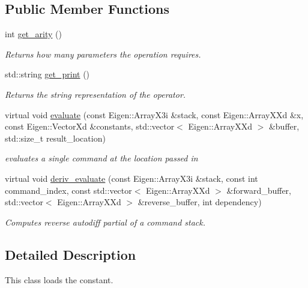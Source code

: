 \subsection*{Public Member Functions}
\begin{DoxyCompactItemize}
\item 
int \hyperlink{classC__Load_ae655fdc171a24965bb5cbb1e2fda9293}{get\+\_\+arity} ()\hypertarget{classC__Load_ae655fdc171a24965bb5cbb1e2fda9293}{}\label{classC__Load_ae655fdc171a24965bb5cbb1e2fda9293}

\begin{DoxyCompactList}\small\item\em Returns how many parameters the operation requires. \end{DoxyCompactList}\item 
std\+::string \hyperlink{classC__Load_a58d4503b40ec02c4da5d5daa1bb51967}{get\+\_\+print} ()\hypertarget{classC__Load_a58d4503b40ec02c4da5d5daa1bb51967}{}\label{classC__Load_a58d4503b40ec02c4da5d5daa1bb51967}

\begin{DoxyCompactList}\small\item\em Returns the string representation of the operator. \end{DoxyCompactList}\item 
virtual void \hyperlink{classC__Load_a82be394b7e177cc378def30ff9972941}{evaluate} (const Eigen\+::\+Array\+X3i \&stack, const Eigen\+::\+Array\+X\+Xd \&x, const Eigen\+::\+Vector\+Xd \&constants, std\+::vector$<$ Eigen\+::\+Array\+X\+Xd $>$ \&buffer, std\+::size\+\_\+t result\+\_\+location)
\begin{DoxyCompactList}\small\item\em evaluates a single command at the location passed in \end{DoxyCompactList}\item 
virtual void \hyperlink{classC__Load_abfe90cef11f940a216284970f6db7b0d}{deriv\+\_\+evaluate} (const Eigen\+::\+Array\+X3i \&stack, const int command\+\_\+index, const std\+::vector$<$ Eigen\+::\+Array\+X\+Xd $>$ \&forward\+\_\+buffer, std\+::vector$<$ Eigen\+::\+Array\+X\+Xd $>$ \&reverse\+\_\+buffer, int dependency)
\begin{DoxyCompactList}\small\item\em Computes reverse autodiff partial of a command stack. \end{DoxyCompactList}\end{DoxyCompactItemize}


\subsection{Detailed Description}
This class loads the constant. 

